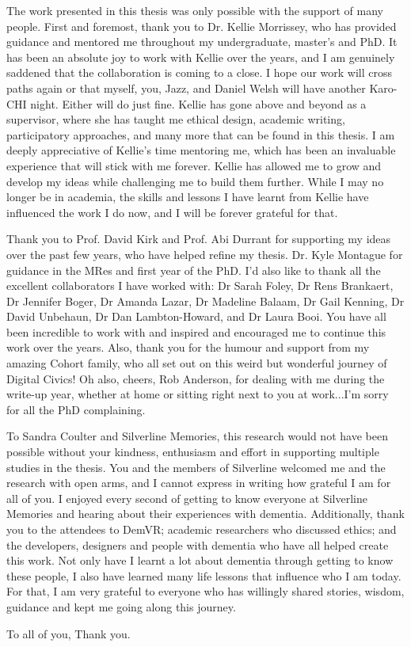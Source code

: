 
\begin{acknowledgements} 
The work presented in this thesis was only possible with the support of many people. First and foremost, thank you to Dr. Kellie Morrissey, who has provided guidance and mentored me throughout my undergraduate, master's and PhD. It has been an absolute joy to work with Kellie over the years, and I am genuinely saddened that the collaboration is coming to a close. I hope our work will cross paths again or that myself, you, Jazz, and Daniel Welsh will have another Karo-CHI night. Either will do just fine. Kellie has gone above and beyond as a supervisor, where she has taught me ethical design, academic writing, participatory approaches, and many more that can be found in this thesis. I am deeply appreciative of Kellie's time mentoring me, which has been an invaluable experience that will stick with me forever. Kellie has allowed me to grow and develop my ideas while challenging me to build them further. While I may no longer be in academia, the skills and lessons I have learnt from Kellie have influenced the work I do now, and I will be forever grateful for that.

Thank you to Prof. David Kirk and Prof. Abi Durrant for supporting my ideas over the past few years, who have helped refine my thesis. Dr. Kyle Montague for guidance in the MRes and first year of the PhD. I'd also like to thank all the excellent collaborators I have worked with: Dr Sarah Foley, Dr Rens Brankaert, Dr Jennifer Boger, Dr Amanda Lazar, Dr Madeline Balaam, Dr Gail Kenning, Dr David Unbehaun, Dr Dan Lambton-Howard, and Dr Laura Booi. You have all been incredible to work with and inspired and encouraged me to continue this work over the years. Also, thank you for the humour and support from my amazing Cohort family, who all set out on this weird but wonderful journey of Digital Civics! Oh also, cheers, Rob Anderson, for dealing with me during the write-up year, whether at home or sitting right next to you at work...I'm sorry for all the PhD complaining. 

To Sandra Coulter and Silverline Memories, this research would not have been possible without your kindness, enthusiasm and effort in supporting multiple studies in the thesis. You and the members of Silverline welcomed me and the research with open arms, and I cannot express in writing how grateful I am for all of you. I enjoyed every second of getting to know everyone at Silverline Memories and hearing about their experiences with dementia. Additionally, thank you to the attendees to DemVR; academic researchers who discussed ethics; and the developers, designers and people with dementia who have all helped create this work. Not only have I learnt a lot about dementia through getting to know these people, I also have learned many life lessons that influence who I am today. For that, I am very grateful to everyone who has willingly shared stories, wisdom, guidance and kept me going along this journey.

To all of you, Thank you.
\end{acknowledgements}

